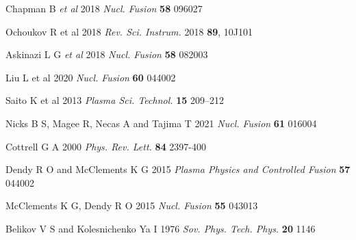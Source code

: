 \documentclass[12pt]{iopart}
\begin{document}
\begin{thebibliography}{9}
Chapman B \textit{et al} 2018 \textit{Nucl. Fusion} \textbf{58} 096027

Ochoukov R et al 2018 \textit{Rev. Sci. Instrum.} 2018 \textbf{89}, 10J101

Askinazi L G  \textit{et al} 2018 \textit{Nucl. Fusion} \textbf{58} 082003

Liu L et al 2020  \textit{Nucl. Fusion} \textbf{60} 044002

Saito K et al 2013 \textit{Plasma Sci. Technol.} \textbf{15} 209–212

Nicks B S, Magee R, Necas A and Tajima T 2021 \textit{Nucl. Fusion} \textbf{61} 016004

Cottrell G A 2000 \textit{Phys. Rev. Lett.} \textbf{84} 2397-400

Dendy R O and McClements K G 2015 \textit{Plasma Physics and Controlled Fusion} \textbf{57} 044002

McClements K G, Dendy R O 2015 \textit{Nucl. Fusion} \textbf{55} 043013

Belikov V S and Kolesnichenko Ya I 1976 \textit{Sov. Phys. Tech. Phys.} \textbf{20} 1146


\end{thebibliography}
\end{document}

